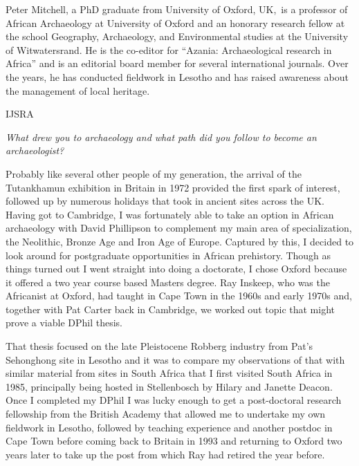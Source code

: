 \documentclass[%
	]{ijsra}
\begin{document}
\IJSRAseparator
{}
{\sffamily Peter Mitchell, a PhD graduate from University of Oxford, UK, is a professor of African Archaeology at University of Oxford and an honorary research fellow at the school Geography, Archaeology, and Environmental studies at the University of Witwatersrand. He is the co-editor for “Azania: Archaeological research in Africa” and is an editorial board member for several international journals. Over the years, he has conducted fieldwork in Lesotho and has raised awareness about the management of local heritage. }
\begin{labeling}{IJSRA}	

\item[IJSRA (International Journal of Student Research in Archaeology)] \emph{What drew you to archaeology and what path did you follow to become an archaeologist?}
	
\item[Peter Mitchell (PM)] Probably like several other people of my generation, the arrival of the Tutankhamun exhibition in Britain in 1972 provided the first spark of interest, followed up by numerous holidays that took in ancient sites across the UK. Having got to Cambridge, I was fortunately able to take an option in African archaeology with David Phillipson to complement my main area of specialization, the Neolithic, Bronze Age and Iron Age of Europe. Captured by this, I decided to look around for postgraduate opportunities in African prehistory. Though as things turned out I went straight into doing a doctorate, I chose Oxford because it offered a two year course based Masters degree. Ray Inskeep, who was the Africanist at Oxford, had taught in Cape Town in the 1960s and early 1970s and, together with Pat Carter back in Cambridge, we worked out topic that might prove a viable DPhil thesis.

That thesis focused on the late Pleistocene Robberg industry from Pat’s Sehonghong site in Lesotho and it was to compare my observations of that with similar material from sites in South Africa that I first visited South Africa in 1985, principally being hosted in Stellenbosch by Hilary and Janette Deacon. Once I completed my DPhil I was lucky enough to get a post-doctoral research fellowship from the British Academy that allowed me to undertake my own fieldwork in Lesotho, followed by teaching experience and another postdoc in Cape Town before coming back to Britain in 1993 and returning to Oxford two years later to take up the post from which Ray had retired the year before.



\end{labeling}
\end{document}

